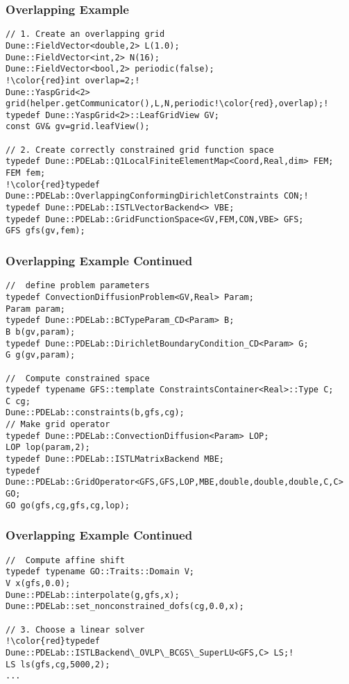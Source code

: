 \begin{frame}[fragile]
  \frametitle{Overlapping Example}
  \begin{lstlisting}[breaklines=true,escapechar=!]
// 1. Create an overlapping grid
Dune::FieldVector<double,2> L(1.0);
Dune::FieldVector<int,2> N(16);
Dune::FieldVector<bool,2> periodic(false);
!\color{red}int overlap=2;!
Dune::YaspGrid<2> grid(helper.getCommunicator(),L,N,periodic!\color{red},overlap);!
typedef Dune::YaspGrid<2>::LeafGridView GV;
const GV& gv=grid.leafView();

// 2. Create correctly constrained grid function space
typedef Dune::PDELab::Q1LocalFiniteElementMap<Coord,Real,dim> FEM;
FEM fem;
!\color{red}typedef Dune::PDELab::OverlappingConformingDirichletConstraints CON;!
typedef Dune::PDELab::ISTLVectorBackend<> VBE;
typedef Dune::PDELab::GridFunctionSpace<GV,FEM,CON,VBE> GFS;
GFS gfs(gv,fem);
\end{lstlisting}
\end{frame}
\begin{frame}[fragile]
\frametitle<presentation>{Overlapping Example Continued}
  \begin{lstlisting}[breaklines=true]
//  define problem parameters
typedef ConvectionDiffusionProblem<GV,Real> Param;
Param param;
typedef Dune::PDELab::BCTypeParam_CD<Param> B;
B b(gv,param);
typedef Dune::PDELab::DirichletBoundaryCondition_CD<Param> G;
G g(gv,param);

//  Compute constrained space
typedef typename GFS::template ConstraintsContainer<Real>::Type C;
C cg;
Dune::PDELab::constraints(b,gfs,cg);
// Make grid operator
typedef Dune::PDELab::ConvectionDiffusion<Param> LOP;
LOP lop(param,2);
typedef Dune::PDELab::ISTLMatrixBackend MBE;
typedef Dune::PDELab::GridOperator<GFS,GFS,LOP,MBE,double,double,double,C,C> GO;
GO go(gfs,cg,gfs,cg,lop);
\end{lstlisting}
\end{frame}
\begin{frame}[fragile]
\frametitle<presentation>{Overlapping Example Continued}
  \begin{lstlisting}[breaklines=true,escapechar=!]
//  Compute affine shift
typedef typename GO::Traits::Domain V;
V x(gfs,0.0);
Dune::PDELab::interpolate(g,gfs,x);
Dune::PDELab::set_nonconstrained_dofs(cg,0.0,x);

// 3. Choose a linear solver
!\color{red}typedef Dune::PDELab::ISTLBackend\_OVLP\_BCGS\_SuperLU<GFS,C> LS;!
LS ls(gfs,cg,5000,2);
...
\end{lstlisting}
\end{frame}

